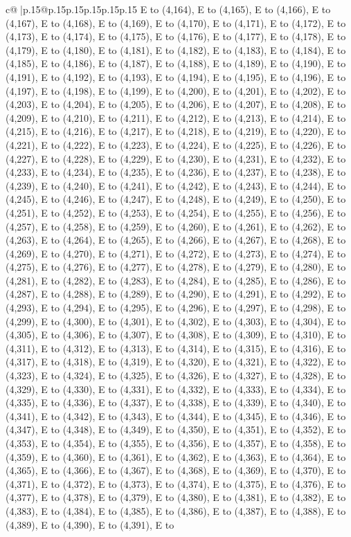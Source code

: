 \documentclass{article}
\begin{document}
{\begin{supertabular}{c@{$\;$}|p{.15\linewidth}@{}p{.15\linewidth}p{.15\linewidth}p{.15\linewidth}p{.15\linewidth}p{.15\linewidth}}
{{{E to (4,164), E to (4,165), E to (4,166), E to (4,167), E to (4,168), E to (4,169), E to (4,170), E to (4,171), E to (4,172), E to (4,173), E to (4,174), E to (4,175), E to (4,176), E to (4,177), E to (4,178), E to (4,179), E to (4,180), E to (4,181), E to (4,182), E to (4,183), E to (4,184), E to (4,185), E to (4,186), E to (4,187), E to (4,188), E to (4,189), E to (4,190), E to (4,191), E to (4,192), E to (4,193), E to (4,194), E to (4,195), E to (4,196), E to (4,197), E to (4,198), E to (4,199), E to (4,200), E to (4,201), E to (4,202), E to (4,203), E to (4,204), E to (4,205), E to (4,206), E to (4,207), E to (4,208), E to (4,209), E to (4,210), E to (4,211), E to (4,212), E to (4,213), E to (4,214), E to (4,215), E to (4,216), E to (4,217), E to (4,218), E to (4,219), E to (4,220), E to (4,221), E to (4,222), E to (4,223), E to (4,224), E to (4,225), E to (4,226), E to (4,227), E to (4,228), E to (4,229), E to (4,230), E to (4,231), E to (4,232), E to (4,233), E to (4,234), E to (4,235), E to (4,236), E to (4,237), E to (4,238), E to (4,239), E to (4,240), E to (4,241), E to (4,242), E to (4,243), E to (4,244), E to (4,245), E to (4,246), E to (4,247), E to (4,248), E to (4,249), E to (4,250), E to (4,251), E to (4,252), E to (4,253), E to (4,254), E to (4,255), E to (4,256), E to (4,257), E to (4,258), E to (4,259), E to (4,260), E to (4,261), E to (4,262), E to (4,263), E to (4,264), E to (4,265), E to (4,266), E to (4,267), E to (4,268), E to (4,269), E to (4,270), E to (4,271), E to (4,272), E to (4,273), E to (4,274), E to (4,275), E to (4,276), E to (4,277), E to (4,278), E to (4,279), E to (4,280), E to (4,281), E to (4,282), E to (4,283), E to (4,284), E to (4,285), E to (4,286), E to (4,287), E to (4,288), E to (4,289), E to (4,290), E to (4,291), E to (4,292), E to (4,293), E to (4,294), E to (4,295), E to (4,296), E to (4,297), E to (4,298), E to (4,299), E to (4,300), E to (4,301), E to (4,302), E to (4,303), E to (4,304), E to (4,305), E to (4,306), E to (4,307), E to (4,308), E to (4,309), E to (4,310), E to (4,311), E to (4,312), E to (4,313), E to (4,314), E to (4,315), E to (4,316), E to (4,317), E to (4,318), E to (4,319), E to (4,320), E to (4,321), E to (4,322), E to (4,323), E to (4,324), E to (4,325), E to (4,326), E to (4,327), E to (4,328), E to (4,329), E to (4,330), E to (4,331), E to (4,332), E to (4,333), E to (4,334), E to (4,335), E to (4,336), E to (4,337), E to (4,338), E to (4,339), E to (4,340), E to (4,341), E to (4,342), E to (4,343), E to (4,344), E to (4,345), E to (4,346), E to (4,347), E to (4,348), E to (4,349), E to (4,350), E to (4,351), E to (4,352), E to (4,353), E to (4,354), E to (4,355), E to (4,356), E to (4,357), E to (4,358), E to (4,359), E to (4,360), E to (4,361), E to (4,362), E to (4,363), E to (4,364), E to (4,365), E to (4,366), E to (4,367), E to (4,368), E to (4,369), E to (4,370), E to (4,371), E to (4,372), E to (4,373), E to (4,374), E to (4,375), E to (4,376), E to (4,377), E to (4,378), E to (4,379), E to (4,380), E to (4,381), E to (4,382), E to (4,383), E to (4,384), E to (4,385), E to (4,386), E to (4,387), E to (4,388), E to (4,389), E to (4,390), E to (4,391), E to }}}
\end{supertabular}}
\end{document}
